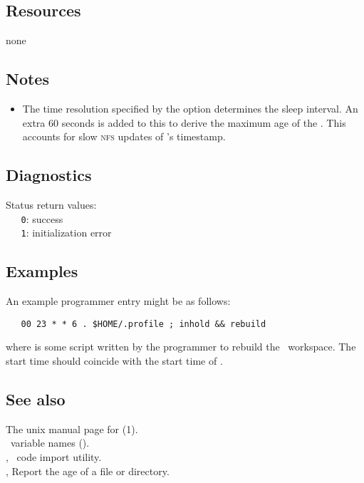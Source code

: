 \subsection*{Resources}
 
none

\subsection*{Notes}
 
\begin{itemize}
\item
   The time resolution specified by the  option determines the sleep
   interval.  An extra 60 seconds is added to this to derive the maximum age
   of the .  This accounts for slow \textsc{nfs} updates of
   's timestamp.
\end{itemize}

\subsection*{Diagnostics}
 
Status return values:
\\ \verb+   0+: success
\\ \verb+   1+: initialization error
 
\subsection*{Examples}
 
An example programmer  entry might be as follows:

\begin{verbatim}
   00 23 * * 6 . $HOME/.profile ; inhold && rebuild
\end{verbatim}

\noindent
where  is some script written by the programmer to rebuild the
\aipspp\ workspace.  The  start time should coincide with the
start time of .

 
\subsection*{See also}
 
The unix manual page for (1).\\
\aipspp\ variable names ().\\
, \aipspp\ code import utility.\\
, Report the age of a file or directory.

